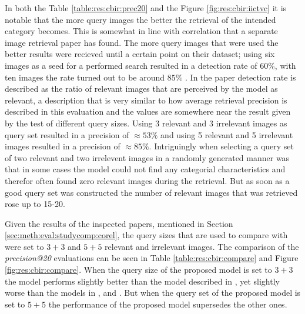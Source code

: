 In both the Table \ref{table:res:cbir:prec20} and the Figure \ref{fig:res:cbir:iictvc} it is notable that the more query images the better the retrieval of the intended category becomes. This is somewhat in line with correlation that a separate image retrieval paper has found. The more query images that were used the better results were recieved until a certain point on their dataset; using six images as a seed for a performed search resulted in a detection rate of $60\%$, with ten images the rate turned out to be around $85\%$ \cite{li2010optimol}. In the paper detection rate is described as the ratio of relevant images that are perceived by the model as relevant, a description that is very similar to how average retrieval precision is described in this evaluation and the values are somewhere near the result given by the test of different query sizes. Using 3 relevant and 3 irrelevant images as query set resulted in a precision of $\approx53\%$ and using 5 relevant and 5 irrelevant images resulted in a precision of $\approx85\%$. Intriguingly when selecting a query set of two relevant and two irrelevent images in a randomly generated manner was that in some cases the model could not find any categorial characteristics and therefor often found zero relevant images during the retrieval. But as soon as a good query set was constructed the number of relevant images that was retrieved rose up to 15-20. 



Given the results of the inspected papers, mentioned in Section \ref{sec:meth:eval:studycomp:corel}, the query sizes that are used to compare with were set to $3+3$ and $5+5$ relevant and irrelevant images. The comparison of the \emph{precision@20} evaluations can be seen in Table \ref{table:res:cbir:compare} and Figure \ref{fig:res:cbir:compare}. When the query size of the proposed model is set to $3+3$ the model performs slightly better than the model described in \cite{wang2001simplicity}, yet slightly worse than the models in \cite{subrahmanyam2013modified}, \cite{nagaraja2015low} and \cite{elalami2014new}. But when the query set of the proposed model is set to $5+5$ the performance of the proposed model supersedes the other ones. 


